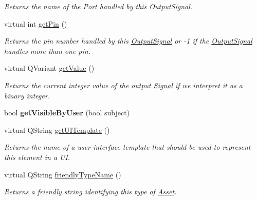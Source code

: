 \begin{DoxyCompactItemize}
\begin{DoxyCompactList}\small\item\em Returns the name of the Port handled by this \hyperlink{struct_picto_1_1_output_signal}{Output\-Signal}. \end{DoxyCompactList}\item 
\hypertarget{struct_picto_1_1_output_signal_a4c2f2e3c15269e29231bd903cd5f9ca9}{virtual int \hyperlink{struct_picto_1_1_output_signal_a4c2f2e3c15269e29231bd903cd5f9ca9}{get\-Pin} ()}\label{struct_picto_1_1_output_signal_a4c2f2e3c15269e29231bd903cd5f9ca9}

\begin{DoxyCompactList}\small\item\em Returns the pin number handled by this \hyperlink{struct_picto_1_1_output_signal}{Output\-Signal} or -\/1 if the \hyperlink{struct_picto_1_1_output_signal}{Output\-Signal} handles more than one pin. \end{DoxyCompactList}\item 
virtual Q\-Variant \hyperlink{struct_picto_1_1_output_signal_ae4ca3f2d3f76dd6979418aba4a256dd7}{get\-Value} ()
\begin{DoxyCompactList}\small\item\em Returns the current integer value of the output \hyperlink{class_picto_1_1_signal}{Signal} if we interpret it as a binary integer. \end{DoxyCompactList}\item 
\hypertarget{struct_picto_1_1_output_signal_a5216e9b36bfdb7c6f4934d52030cad8f}{bool {\bfseries get\-Visible\-By\-User} (bool subject)}\label{struct_picto_1_1_output_signal_a5216e9b36bfdb7c6f4934d52030cad8f}

\item 
\hypertarget{struct_picto_1_1_output_signal_ac6a74459af41e7629188b270d620fae7}{virtual Q\-String \hyperlink{struct_picto_1_1_output_signal_ac6a74459af41e7629188b270d620fae7}{get\-U\-I\-Template} ()}\label{struct_picto_1_1_output_signal_ac6a74459af41e7629188b270d620fae7}

\begin{DoxyCompactList}\small\item\em Returns the name of a user interface template that should be used to represent this element in a U\-I. \end{DoxyCompactList}\item 
virtual Q\-String \hyperlink{struct_picto_1_1_output_signal_a3603021461f1c250702a5a5aa0eee3a5}{friendly\-Type\-Name} ()
\begin{DoxyCompactList}\small\item\em Returns a friendly string identifying this type of \hyperlink{class_picto_1_1_asset}{Asset}. \end{DoxyCompactList}\end{DoxyCompactItemize}
